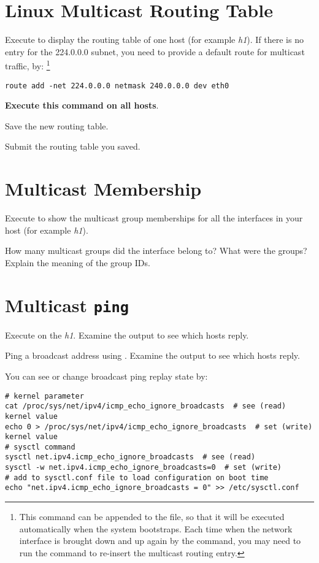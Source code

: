 \documentclass{../UTNetLab}
\begin{document}
\section{Linux Multicast Routing Table}
\label{sec:linux-multicast-routing}
Execute  to display the routing table of one host (for example \textit{h1}).
If there is no entry for the 224.0.0.0 subnet, you need to provide a default route for multicast traffic, by:
\footnote{This command can be appended to the  file, so that it will be executed automatically when the system bootstraps.
    Each time when the network interface is brought down and up again by the  command, you may need to run the  command to re-insert the multicast routing entry.}
\begin{lstlisting}[emph=eth0,morekeywords={[3]add,netmask,dev}]
route add -net 224.0.0.0 netmask 240.0.0.0 dev eth0
    \end{lstlisting}
\textbf{Execute this command on all hosts}.

Save the new routing table.

\begin{report}
    \item Submit the routing table you saved.
\end{report}

\section{Multicast Membership}
Execute  to show the multicast group memberships for all the interfaces in your host (for example \textit{h1}).

\begin{report}
    \item How many multicast groups did the interface belong to? What were the groups? Explain the meaning of the group IDs.
\end{report}

\section{Multicast \texttt{ping}}
Execute  on the \textit{h1}.
Examine the  output to see which hosts reply.

Ping a broadcast address using .
Examine the  output to see which hosts reply.

You can see or change broadcast ping replay state by:
\begin{lstlisting}[emph=eth0]
# kernel parameter
cat /proc/sys/net/ipv4/icmp_echo_ignore_broadcasts  # see (read) kernel value
echo 0 > /proc/sys/net/ipv4/icmp_echo_ignore_broadcasts  # set (write) kernel value
# sysctl command
sysctl net.ipv4.icmp_echo_ignore_broadcasts  # see (read)
sysctl -w net.ipv4.icmp_echo_ignore_broadcasts=0  # set (write)
# add to sysctl.conf file to load configuration on boot time
echo "net.ipv4.icmp_echo_ignore_broadcasts = 0" >> /etc/sysctl.conf
\end{lstlisting}
\end{document}
